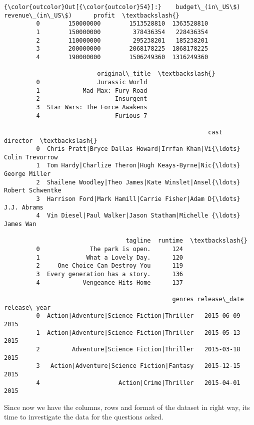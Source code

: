 \documentclass[11pt]{article}
\begin{document}
\begin{Verbatim}[commandchars=\\\{\}]
{\color{outcolor}Out[{\color{outcolor}54}]:}    budget\_(in\_US\$)  revenue\_(in\_US\$)      profit  \textbackslash{}
         0        150000000        1513528810  1363528810   
         1        150000000         378436354   228436354   
         2        110000000         295238201   185238201   
         3        200000000        2068178225  1868178225   
         4        190000000        1506249360  1316249360   
         
                          original\_title  \textbackslash{}
         0                Jurassic World   
         1            Mad Max: Fury Road   
         2                     Insurgent   
         3  Star Wars: The Force Awakens   
         4                     Furious 7   
         
                                                         cast          director  \textbackslash{}
         0  Chris Pratt|Bryce Dallas Howard|Irrfan Khan|Vi{\ldots}   Colin Trevorrow   
         1  Tom Hardy|Charlize Theron|Hugh Keays-Byrne|Nic{\ldots}     George Miller   
         2  Shailene Woodley|Theo James|Kate Winslet|Ansel{\ldots}  Robert Schwentke   
         3  Harrison Ford|Mark Hamill|Carrie Fisher|Adam D{\ldots}       J.J. Abrams   
         4  Vin Diesel|Paul Walker|Jason Statham|Michelle {\ldots}         James Wan   
         
                                  tagline  runtime  \textbackslash{}
         0              The park is open.      124   
         1             What a Lovely Day.      120   
         2     One Choice Can Destroy You      119   
         3  Every generation has a story.      136   
         4            Vengeance Hits Home      137   
         
                                               genres release\_date  release\_year  
         0  Action|Adventure|Science Fiction|Thriller   2015-06-09          2015  
         1  Action|Adventure|Science Fiction|Thriller   2015-05-13          2015  
         2         Adventure|Science Fiction|Thriller   2015-03-18          2015  
         3   Action|Adventure|Science Fiction|Fantasy   2015-12-15          2015  
         4                      Action|Crime|Thriller   2015-04-01          2015  
\end{Verbatim}
            
    Since now we have the columns, rows and format of the dataset in right
way, its time to investigate the data for the questions asked.
\end{document}
